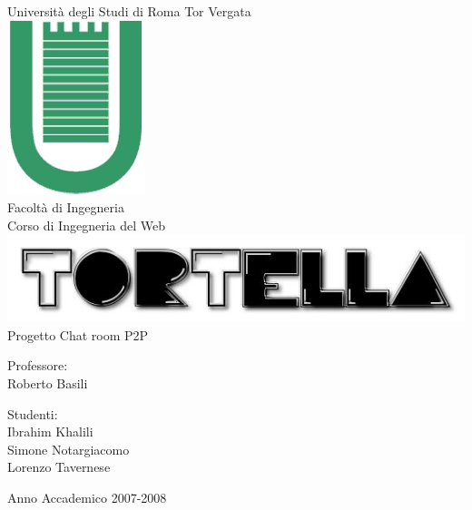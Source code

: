 \begin{titlepage}
\begin{center}
\LARGE{Università degli Studi di Roma Tor Vergata}\\
\vspace{10mm}
\includegraphics[scale=0.50]{etc/logo.jpg}\\
Facoltà di Ingegneria\\
\vspace{5mm}
\normalsize{Corso di Ingegneria del Web}\\
\vspace{20mm}
\includegraphics[scale=0.40]{etc/tortellalogo.jpg}\\
\large{Progetto Chat room P2P}\\
\end{center}
\vspace{40mm}
\begin{minipage}[t]{0.30\textwidth}
\begin{center}
{\normalsize{Professore:\\
Roberto Basili}}
\end{center}
\end{minipage}
\hfill
\begin{minipage}[t]{0.30\textwidth}
\begin{center}
{\normalsize{Studenti:\\
Ibrahim Khalili\\
Simone Notargiacomo\\
Lorenzo Tavernese}}
\end{center}
\end{minipage}
\vspace{10mm}
\begin{center}
Anno Accademico 2007-2008
\end{center}

\end{titlepage}